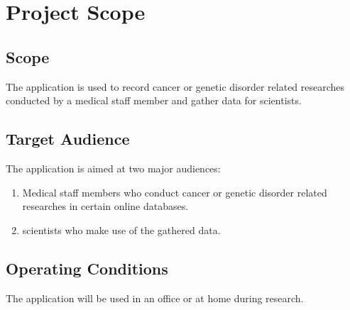 \chapter{Project Scope}
\label{ch:scope}

\section{Scope}
The application is used to record cancer or genetic disorder related researches conducted by a medical staff member and gather data for \glspl{scientist}.
\section{Target Audience}
The application is aimed at two major audiences:
\begin{enumerate}
    \item Medical staff members who conduct cancer or genetic disorder related researches in certain online databases.
    \item \Glspl{scientist} who make use of the gathered data.
\end{enumerate}
\section{Operating Conditions}
The application will be used in an office or at home during research.